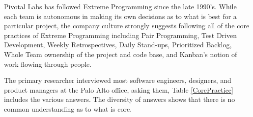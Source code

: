 Pivotal Labs has followed Extreme Programming \cite{ExtremeProgramming2004} since the late 1990's. While each team is autonomous in making its own decisions as to what is best for a particular project, the company culture strongly suggests following all of the core practices of Extreme Programming including Pair Programming, Test Driven Development, Weekly Retrospectives, Daily Stand-ups, Prioritized Backlog, Whole Team ownership of the project and code base, and Kanban's notion of work flowing through people.

The primary researcher interviewed most software engineers, designers, and product managers at the Palo Alto office, asking them,  Table \ref{CorePractice} includes the various answers. The diversity of answers shows that there is no common understanding as to what is core. 

